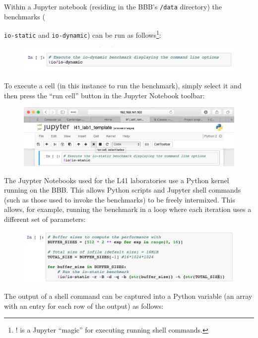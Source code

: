 \documentclass[a4paper,10pt]{article}
\begin{document}
Within a Jupyter notebook (residing in the BBB's \texttt{/data} directory) the
benchmarks ({\texttt{io-static} and \texttt{io-dynamic}) can be run as
follows\footnote{! is a Jupyter ``magic'' for executing running shell
commands.}:

\begin{figure}[H]
\includegraphics[width=\linewidth]{jupyter_running_benchmark.png}
\end{figure}

To execute a cell (in this instance to run the benchmark), simply select it and
then press the ``run cell'' button in the Jupyter Notebook toolbar:

\begin{figure}[H]
\includegraphics[width=\linewidth]{jupyter_run_cell.png}
\end{figure}

The Juypter Notebooks used for the L41 laboratories use a Python kernel running
on the BBB. This allows Python scripts and Jupyter shell commands
(such as those used to invoke the benchmarks) to be freely intermixed. This 
allows, for example, running the benchmark in a loop where each
iteration uses a different set of parameters:

\begin{figure}[H]
\includegraphics[width=\linewidth]{jupyter_running_benchmark_loop.png}
\end{figure}

The output of a shell command can be captured into a Python variable (an array
with an entry for each row of the output) as follows:

}
\end{document}

